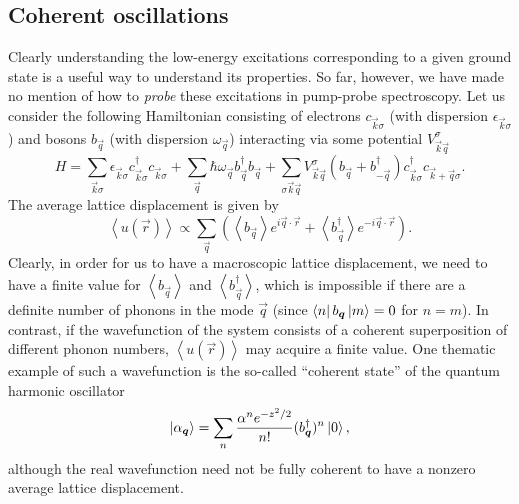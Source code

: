 \subsection{Coherent oscillations}\label{sec:coherentoscillations}

Clearly understanding the low-energy excitations corresponding to a given ground state is a useful way to understand its properties.
So far, however, we have made no mention of how to \emph{probe} these excitations in pump-probe spectroscopy.
Let us consider the following Hamiltonian consisting of electrons $c_{\vec{k}\sigma}$ (with dispersion $\epsilon_{\vec{k}\sigma}$) and bosons $b_{\vec{q}}$ (with dispersion $\omega_{\vec{q}}$) interacting via some potential $V^\sigma_{\vec{k}\vec{q}}$
\begin{equation}\label{eq:electronlatticehamiltonian}
H = \sum_{\vec{k}\sigma}\epsilon_{\vec{k}\sigma}c^\dagger_{\vec{k}\sigma}c_{\vec{k}\sigma}
+\sum_{\vec{q}}\hbar \omega_{\vec{q}}b^\dagger_{\vec{q}}b_{\vec{q}}
+\sum_{\sigma\vec{k}\vec{q}}V^\sigma_{\vec{k}\vec{q}}\left(b_{\vec{q}}+b^\dagger_{-\vec{q}}\right)c^\dagger_{\vec{k}\sigma}c_{\vec{k}+\vec{q}\sigma}.
\end{equation}
The average lattice displacement is given by
\begin{equation}
\left<u(\vec{r})\right> \propto \sum_{\vec{q}}\left(\left<b_{\vec{q}}\right>e^{i\vec{q}\cdot\vec{r}}+\left<b^\dagger_{\vec{q}}\right>e^{-i\vec{q}\cdot\vec{r}}\right).
\end{equation}
Clearly, in order for us to have a macroscopic lattice displacement, we need to have a finite value for $\left<b_{\vec{q}}\right>$ and $\left<b^\dagger_{\vec{q}}\right>$, which is impossible if there are a definite number of phonons in the mode $\vec{q}$ (since $\bra{n}b_{\bm{q}}\ket{m}=0$ for $n=m$).
In contrast, if the wavefunction of the system consists of a coherent superposition of different phonon numbers, $\left<u(\vec{r})\right>$ may acquire a finite value.
One thematic example of such a wavefunction is the so-called ``coherent state'' of the quantum harmonic oscillator
\begin{equation}\label{eq:coherentstate}
\ket{\alpha_{\bm{q}}} = \sum_n \frac{\alpha^ne^{-z^2/2}}{n!}(b^\dagger_{\bm{q}})^n\ket{0},
\end{equation}
although the real wavefunction need not be fully coherent to have a nonzero average lattice displacement.

